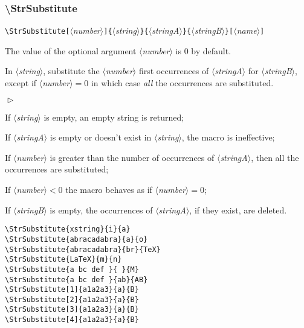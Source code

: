 \documentclass[a4paper,10pt]{article}
\newcommand\argu[1]{$\langle$\textit{#1}$\rangle$}
\newcommand\ARGU[1]{\texttt{\{}\argu{#1}\texttt{\}}}
\newcommand\arguC[1]{\texttt{[}\argu{#1}\texttt{]}}
\newenvironment{Conditions}[1][1cm]%
{\begin{list}%
	{$\vartriangleright$}%
	{\setlength{\leftmargin}{#1}
	 \setlength{\itemsep}{0pt}
	 \setlength{\parsep}{0pt}
	 \setlength{\topsep}{2ptplus3ptminus2pt}
	}}%
{\end{list}}
\newcommand\styleexemple{\small\vskip4pt}
\newcommand\verbinline{\lstinline[basicstyle=\normalsize\ttfamily]}
\begin{document}
\subsubsection{\ttfamily\textbackslash StrSubstitute}

\verbinline|\StrSubstitute|\arguC{number}\ARGU{string}\ARGU{stringA}\ARGU{stringB}\arguC{name}
\smallskip

The value of the optional argument \argu{number} is 0 by default.\par\smallskip

In \argu{string}, substitute the \argu{number} first occurrences of \argu{stringA} for \argu{stringB}, except if \argu{number}${}=0$ in which case \emph{all} the occurrences are substituted.

\begin{Conditions}
\item If \argu{string} is empty, an empty string is returned;
\item If \argu{stringA} is empty or doesn't exist in \argu{string}, the macro is ineffective;
\item If \argu{number} is greater than the number of occurrences of \argu{stringA}, then all the occurrences are substituted;
\item If \argu{number}${}<0$ the macro behaves as if \argu{number}${}=0$;
\item If \argu{stringB} is empty, the occurrences of \argu{stringA}, if they exist, are deleted.
\end{Conditions}

\begin{minipage}[t]{0.65\linewidth}
\begin{lstlisting}
\StrSubstitute{xstring}{i}{a}
\StrSubstitute{abracadabra}{a}{o}
\StrSubstitute{abracadabra}{br}{TeX}
\StrSubstitute{LaTeX}{m}{n}
\StrSubstitute{a bc def }{ }{M}
\StrSubstitute{a bc def }{ab}{AB}
\StrSubstitute[1]{a1a2a3}{a}{B}
\StrSubstitute[2]{a1a2a3}{a}{B}
\StrSubstitute[3]{a1a2a3}{a}{B}
\StrSubstitute[4]{a1a2a3}{a}{B}
\end{lstlisting}%
\end{minipage}\hfill
\begin{minipage}[t]{0.35\linewidth}
	\styleexemple
	\par
	\par
	\par
	\par
	\par
	\par
	\par
	\par
	\par
\end{minipage}%
\end{document}
